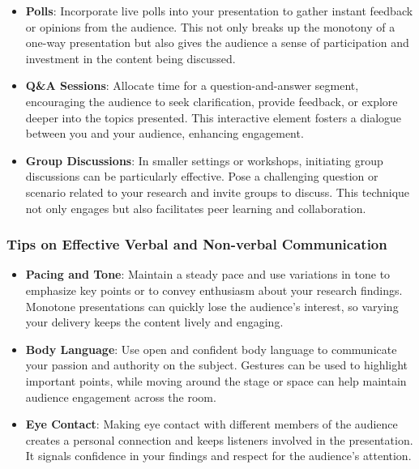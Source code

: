 \documentclass[
]{book}
\begin{document}
\begin{itemize}
\item
  \textbf{Polls}: Incorporate live polls into your presentation to gather instant feedback or opinions from the audience. This not only breaks up the monotony of a one-way presentation but also gives the audience a sense of participation and investment in the content being discussed.
\item
  \textbf{Q\&A Sessions}: Allocate time for a question-and-answer segment, encouraging the audience to seek clarification, provide feedback, or explore deeper into the topics presented. This interactive element fosters a dialogue between you and your audience, enhancing engagement.
\item
  \textbf{Group Discussions}: In smaller settings or workshops, initiating group discussions can be particularly effective. Pose a challenging question or scenario related to your research and invite groups to discuss. This technique not only engages but also facilitates peer learning and collaboration.
\end{itemize}

\hypertarget{tips-on-effective-verbal-and-non-verbal-communication}{%
\subsubsection{Tips on Effective Verbal and Non-verbal Communication}\label{tips-on-effective-verbal-and-non-verbal-communication}}

\begin{itemize}
\item
  \textbf{Pacing and Tone}: Maintain a steady pace and use variations in tone to emphasize key points or to convey enthusiasm about your research findings. Monotone presentations can quickly lose the audience's interest, so varying your delivery keeps the content lively and engaging.
\item
  \textbf{Body Language}: Use open and confident body language to communicate your passion and authority on the subject. Gestures can be used to highlight important points, while moving around the stage or space can help maintain audience engagement across the room.
\item
  \textbf{Eye Contact}: Making eye contact with different members of the audience creates a personal connection and keeps listeners involved in the presentation. It signals confidence in your findings and respect for the audience's attention.
\end{itemize}
\end{document}
